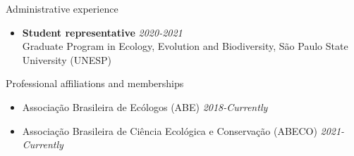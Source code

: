 \documentclass{resume}
\begin{document}

\begin{rSection}{Administrative experience}
\begin{itemize}
\item {\bf Student representative} \hfill{\em 2020-2021}\\
Graduate Program in Ecology, Evolution and Biodiversity, São Paulo State University (UNESP)
\end{itemize}
\end{rSection}


\begin{rSection}{Professional affiliations and memberships}
\begin{itemize}
\item Associação Brasileira de Ecólogos (ABE) \hfill{\em 2018-Currently}
\item Associação Brasileira de Ciência Ecológica e Conservação (ABECO) \hfill{\em 2021-Currently}
\end{itemize}
\end{rSection}

\end{document}
